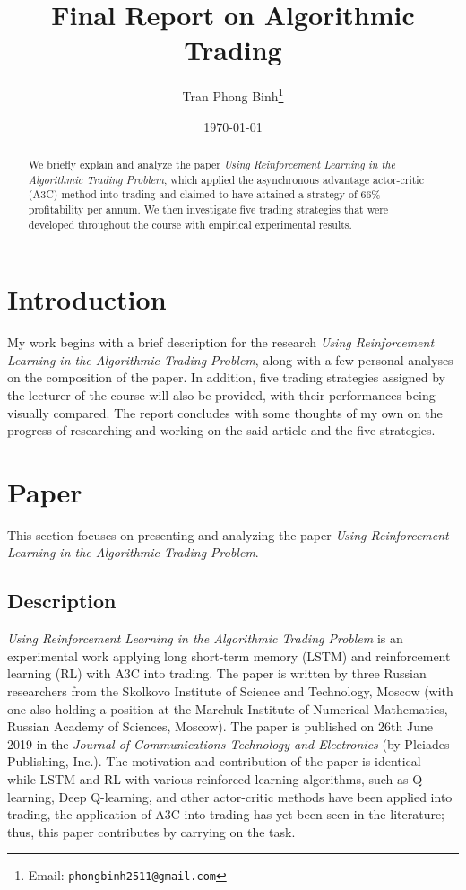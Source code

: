 \documentclass[12pt, letterpaper, oneside]{article}
\title{\textbf{Final Report on Algorithmic Trading}}
\author{Tran Phong Binh\thanks{Email: \texttt{phongbinh2511@gmail.com}}}
\affil{Department of Computer Science and Information Technology,
National Taipei University of Technology, Taipei}
\date{\today}
\begin{document}
\maketitle

\begin{abstract}
We briefly explain and analyze the paper \textit{Using Reinforcement Learning in the Algorithmic Trading Problem}\cite{a3c_trading}, which applied the asynchronous advantage actor-critic (A3C) method into trading and claimed to have attained a strategy of 66\% profitability per annum. We then investigate five trading strategies that were developed throughout the course with empirical experimental results.
\end{abstract}

\section{Introduction}
My work begins with a brief description for the research \textit{Using Reinforcement Learning in the Algorithmic Trading Problem}, along with a few personal analyses on the composition of the paper. In addition, five trading strategies assigned by the lecturer of the course will also be provided, with their performances being visually compared. The report concludes with some thoughts of my own on the progress of researching and working on the said article and the five strategies.

\section{Paper}
This section focuses on presenting and analyzing the paper \textit{Using Reinforcement Learning in the Algorithmic Trading Problem}.

\subsection{Description}
\textit{Using Reinforcement Learning in the Algorithmic Trading Problem} is an experimental work applying long short-term memory (LSTM) and reinforcement learning (RL) with A3C into trading. The paper is written by three Russian researchers from the Skolkovo Institute of Science and Technology, Moscow (with one also holding a position at the Marchuk Institute of Numerical Mathematics, Russian Academy of Sciences, Moscow). The paper is published on 26th June 2019 in the \textit{Journal of Communications Technology and Electronics} (by Pleiades Publishing, Inc.). The motivation and contribution of the paper is identical -- while LSTM and RL with various reinforced learning algorithms, such as Q-learning\cite{q_learning}, Deep Q-learning\cite{deep}, and other actor-critic methods\cite{ac1, ac2} have been applied into trading, the application of A3C into trading has yet been seen in the literature; thus, this paper contributes by carrying on the task.
\end{document}
